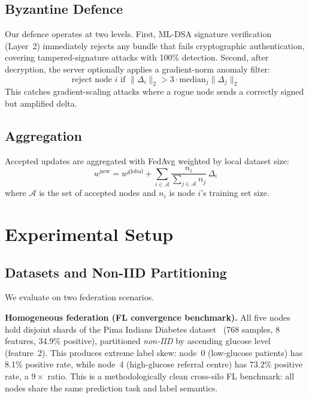 \documentclass[conference]{IEEEtran}
\begin{document}
\subsection{Byzantine Defence}

Our defence operates at two levels.
First, ML-DSA signature verification (Layer~2) immediately rejects
any bundle that fails cryptographic authentication, covering
tampered-signature attacks with 100\% detection.
Second, after decryption, the server optionally applies a
gradient-norm anomaly filter:
\begin{equation}
  \text{reject node } i \text{ if } \|\Delta_i\|_2 > 3 \cdot \text{median}_j\|\Delta_j\|_2
\end{equation}
This catches gradient-scaling attacks where a rogue node sends a
correctly signed but amplified delta.

\subsection{Aggregation}

Accepted updates are aggregated with FedAvg weighted by local
dataset size:
\begin{equation}
  w^{\text{new}} = w^{\text{global}} +
    \sum_{i \in \mathcal{A}} \frac{n_i}{\sum_{j\in\mathcal{A}} n_j}\,\Delta_i
\end{equation}
where $\mathcal{A}$ is the set of accepted nodes and $n_i$ is node
$i$'s training set size.

\section{Experimental Setup}
\label{sec:setup}

\subsection{Datasets and Non-IID Partitioning}

We evaluate on two federation scenarios.

\textbf{Homogeneous federation (FL convergence benchmark).}
All five nodes hold disjoint shards of the Pima Indians Diabetes
dataset~\cite{smith1988} (768 samples, 8 features, 34.9\% positive),
partitioned \emph{non-IID} by ascending glucose level (feature~2).
This produces extreme label skew: node~0 (low-glucose patients)
has 8.1\% positive rate, while node~4 (high-glucose referral
centre) has 73.2\% positive rate, a $9\times$ ratio.
This is a methodologically clean cross-silo FL benchmark: all nodes
share the same prediction task and label semantics.
\end{document}
